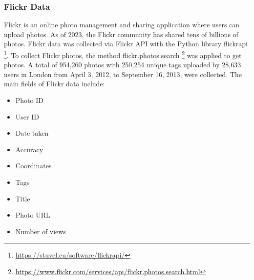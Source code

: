 \documentclass{article}
\theoremstyle{remark}
\begin{document}
\subsubsection{Flickr Data} \label{preprocess_flickr}
Flickr is an online photo management and sharing application where users can upload photos. As of 2023, the Flickr community has shared tens of billions of photos. Flickr data was collected via Flickr API with the Python library flickrapi \footnote{\url{https://stuvel.eu/software/flickrapi/}}. To collect Flickr photos, the method flickr.photos.search \footnote{\url{https://www.flickr.com/services/api/flickr.photos.search.html}} was applied to get photos. A total of 954,260 photos with 250,254 unique tags uploaded by 28,633 users in London from April 3, 2012, to September 16, 2013, were collected. The main fields of Flickr data include:
\begin{itemize}
    \item Photo ID
    \item User ID
    \item Date taken
    \item Accuracy
    \item Coordinates
    \item Tags
    \item Title
    \item Photo URL
    \item Number of views
\end{itemize}
\end{document}
